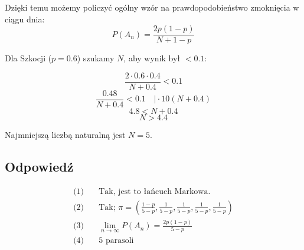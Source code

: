 Dzięki temu możemy policzyć ogólny wzór na prawdopodobieństwo zmoknięcia w ciągu dnia:
\[
	P(A_n) = \frac{2p(1 - p)}{N + 1 - p}
\]

Dla Szkocji (\(p = 0.6\)) szukamy \(N\), aby wynik był \(< 0.1\):

\[
	\frac{2 \cdot 0.6 \cdot 0.4}{N + 0.4} < 0.1
\]
\[
	\frac{0.48}{N + 0.4} < 0.1 \quad \Big| \cdot 10(N+0.4)
\]
\[
	4.8 < N + 0.4
\]
\[
	N > 4.4
\]

Najmniejszą liczbą naturalną jest \(N = 5\).

\subsection*{Odpowiedź}
\[
	\boxed{\begin{aligned}
			\text{(1)} & \quad \text{Tak, jest to łańcuch Markowa.}                                                                                    \\
			\text{(2)} & \quad \text{Tak; } \pi = \left(\frac{1 - p}{5 - p}, \frac{1}{5 - p}, \frac{1}{5 - p}, \frac{1}{5 - p}, \frac{1}{5 - p}\right) \\
			\text{(3)} & \quad \lim_{n \to \infty} P(A_n) = \frac{2p(1 - p)}{5 - p}                                                                    \\
			\text{(4)} & \quad 5 \text{ parasoli}
		\end{aligned}}
\]